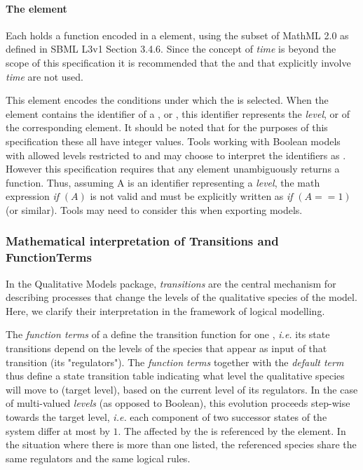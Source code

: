 \paragraph{The  element}
Each  holds a  function encoded in a  element, using the subset of MathML 2.0 as defined in SBML L3v1 Section 3.4.6. Since the concept of \emph{time} is beyond the scope of this specification it is recommended that the   and  that explicitly involve \emph{time} are not used.

This element encodes the conditions under which the \FunctionTerm is selected. When the  element contains the identifier of a \QualitativeSpecies, \Input or \Output, this identifier represents the \emph{level},  or  of the corresponding element. It should be noted that for the purposes of this specification these all have integer values. Tools working with Boolean  models with allowed levels restricted to  and  may choose to interpret the identifiers as .  However this specification  requires that any  element unambiguously returns a  function. Thus, assuming A is an identifier representing a \emph{level}, the math expression \textit{if} $(A)$ is not valid and must be explicitly written as \textit{if} $(A == 1)$ (or similar). Tools may need to consider this when exporting models.

\subsubsection{Mathematical interpretation of Transitions and FunctionTerms}
\label{math-interpret}

In the Qualitative Models  package, {\em transitions} are the central mechanism for describing processes that change the levels of the qualitative species of the model. Here, we clarify their interpretation in the framework of logical modelling.

The {\em function terms}  of a \Transition define the transition function for one , {\em i.e.} its state transitions depend on the levels of the species that appear as input of that transition (its "regulators"). The {\em function terms} together with the {\em default term} thus define a state transition table indicating what level the qualitative species will move to (target level), based on the current level of its regulators. In the case of multi-valued \emph{levels} (as opposed to Boolean), this evolution proceeds step-wise towards the target level, {\em i.e.} each component of two successor states of the system differ at most by $1$. The  affected by the \Transition is referenced by the \Output element. In the situation where there is more than one \Output listed, the referenced species share the same regulators and the same logical rules.

